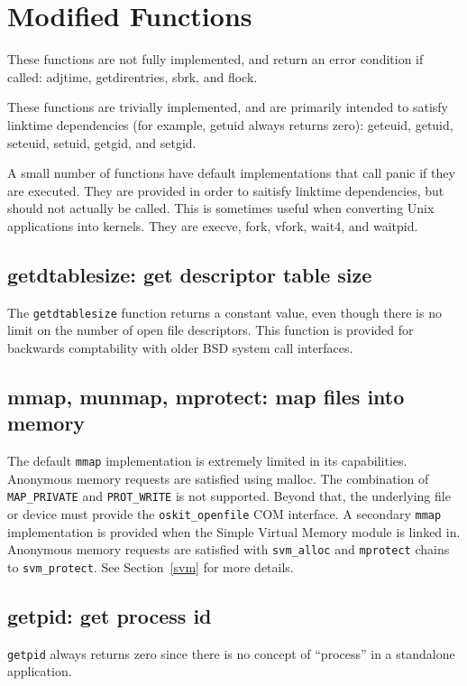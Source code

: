 \section{Modified Functions}

These functions are not fully implemented, and return an error condition if
called: adjtime, getdirentries, sbrk, and flock.

These functions are trivially implemented, and are primarily intended to
satisfy linktime dependencies (for example, getuid always returns zero):
geteuid, getuid, seteuid, setuid, getgid, and setgid.

A small number of functions have default implementations that call panic if
they are executed. They are provided in order to saitisfy linktime
dependencies, but should not actually be called. This is sometimes useful
when converting Unix applications into \oskit{} kernels. They are execve,
fork, vfork, wait4, and waitpid.

\subsection{getdtablesize: get descriptor table size}

The \texttt{getdtablesize} function returns a constant value, even though
there is no limit on the number of open file descriptors. This function is
provided for backwards comptability with older BSD system call interfaces.

\subsection{mmap, munmap, mprotect: map files into memory}
The default \texttt{mmap} implementation is extremely limited in its
capabilities. Anonymous memory requests are satisfied using malloc. The
combination of \texttt{MAP_PRIVATE} and \texttt{PROT_WRITE} is not
supported. Beyond that, the underlying file or device must provide the
\texttt{oskit_openfile} COM interface. A secondary \texttt{mmap}
implementation is provided when the Simple Virtual Memory module is linked
in. Anonymous memory requests are satisfied with \texttt{svm_alloc} and
\texttt{mprotect} chains to \texttt{svm_protect}. See Section~\ref{svm} for
more details.

\subsection{getpid: get process id}
\texttt{getpid} always returns zero since there is no concept of
``process'' in a standalone \oskit{} application.

